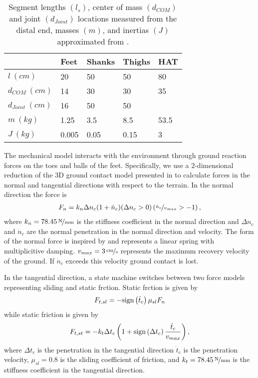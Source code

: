 \begin{table}[b]
  \centering
      \begin{tabular}{lllll}
        \toprule
        & Feet & Shanks & Thighs & HAT \\
        \midrule
        $l         \ (\unit{cm})$ & 20    & 50   & 50   & 80   \\
        $d_{COM}   \ (\unit{cm})$ & 14    & 30   & 30   & 35   \\
        $d_{Joint} \ (\unit{cm})$ & 16    & 50   & 50   &      \\
        $m         \ (\unit{kg})$ & 1.25  & 3.5  & 8.5  & 53.5 \\
        $J         \ (\unit{kg})$ & 0.005 & 0.05 & 0.15 & 3    \\
        \bottomrule
      \end{tabular}
  \caption{Segment lengths $(l_s)$, center of mass $(d_{COM})$ and joint
  $(d_{Joint})$ locations measured from the distal end, masses $(m)$, and
  inertias $(J)$ approximated from
  \citet{gunther2003synthesis}.}\label{tab:model_mech_params}
\end{table}

The mechanical model interacts with the environment through ground reaction
forces on the toes and balls of the feet. Specifically, we use a 2-dimensional
reduction of the 3D ground contact model presented in
\citet{song2013generalization} to calculate forces in the normal and
tangential directions with respect to the terrain. In the normal direction the
force is
\begin{align}
    F_n = k_n \Delta n_c (1 + \dot n_c) (\Delta n_c  > 0)
    \left(\nicefrac{\dot n_c}{v_{max}} > -1 \right),
    \label{eq:grf_n}
\end{align}
where $k_n = \unitfrac[78.45]{N}{mm}$ is the stiffness coefficient in
the normal direction and $\Delta n_c$ and $\dot n_c$ are the normal penetration
in the normal direction and velocity. The form of the normal force is inspired
by \citet{gunther2003synthesis, scott1993biomechanical} and represents a linear
spring with multiplicitive damping.  $v_{max} = \unitfrac[3]{cm}{s}$ represents
the maximum recovery velocity of the ground. If $\dot n_c$ exceeds this
velocity ground contact is lost.

In the tangential direction, a state machine switches between two force models
representing sliding and static frction. Static frction is given by
\begin{align}
    F_{t,sl} = -\mathrm{sign}\left( \dot t_c \right) \mu_{sl} F_n
\end{align}
while static friction is given by
\begin{align}
    F_{t,st} = -k_t \Delta t_c \left(1 + \mathrm{sign}\left( \Delta t_c \right)
    \frac{\dot t_c}{v_{max}} \right),
\end{align}
where $\Delta t_c$ is the penetration in the tangential direction $\dot t_c$
is the penetration velocity, $\mu_{sl} = 0.8$ is the sliding coefficient of
friction, and $k_t =\unitfrac[78.45]{N}{mm}$ is the stiffness coefficient in the
tangential direction.

